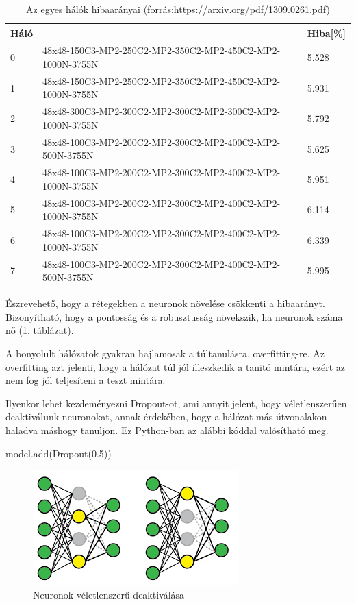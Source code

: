 \begin{table}[h]
\centering
\begin{tabular}{|l|l|l|}
\hline
 Háló &                                                                      & Hiba[\%] \\ \hline
0               & 48x48-150C3-MP2-250C2-MP2-350C2-MP2-450C2-MP2-1000N-3755N & 5.528 \\ \hline
1               & 48x48-150C3-MP2-250C2-MP2-350C2-MP2-450C2-MP2-1000N-3755N & 5.931 \\ \hline
2               & 48x48-300C3-MP2-300C2-MP2-300C2-MP2-300C2-MP2-1000N-3755N & 5.792 \\ \hline
3               & 48x48-100C3-MP2-200C2-MP2-300C2-MP2-400C2-MP2-500N-3755N  & 5.625 \\ \hline
4               & 48x48-100C3-MP2-200C2-MP2-300C2-MP2-400C2-MP2-1000N-3755N & 5.951 \\ \hline
5               & 48x48-100C3-MP2-200C2-MP2-300C2-MP2-400C2-MP2-1000N-3755N & 6.114 \\ \hline
6               & 48x48-100C3-MP2-200C2-MP2-300C2-MP2-400C2-MP2-1000N-3755N & 6.339 \\ \hline
7               & 48x48-100C3-MP2-200C2-MP2-300C2-MP2-400C2-MP2-500N-3755N  & 5.995 \\ \hline
\end{tabular}
\caption{Az egyes hálók hibaarányai (forrás:\url{https://arxiv.org/pdf/1309.0261.pdf})}
\label{tab:ann_result}
\end{table}

Észrevehető, hogy a rétegekben a neuronok növelése csökkenti a hibaarányt. Bizonyítható, hogy a pontosság és a robusztusság növekszik, ha neuronok száma nő (\ref{tab:ann_result}. táblázat).

A bonyolult hálózatok gyakran hajlamosak a túltanulásra, overfitting-re. Az overfitting azt jelenti, hogy a hálózat túl jól illeszkedik a tanitó mintára, ezért az nem fog jól teljesíteni a teszt mintára.

Ilyenkor lehet kezdeményezni Dropout-ot, ami annyit jelent, hogy véletlenszerűen deaktiválunk neuronokat, annak érdekében, hogy a hálózat más útvonalakon haladva máshogy tanuljon. Ez Python-ban az alábbi kóddal valósítható meg.
\begin{python}
model.add(Dropout(0.5))
\end{python}

\begin{figure}[h]
\centering
\includegraphics[scale=0.8]{images/dropout}
\caption{Neuronok véletlenszerű deaktiválása}
\label{fig:dropout}
\end{figure} 


